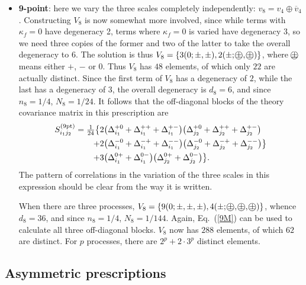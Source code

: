 \begin{itemize}
\item \textbf{9-point}: here we vary the three scales completely
  independently: $v_8 = v_4 \oplus \overline{v}_4$. Constructing
  $V_{8}$ is now somewhat more involved, since while terms with $\kappa_f=0$
  have degeneracy 2, terms where $\kappa_f=0$ is varied have
  degeneracy 3, so we need three copies of the former and two of the
  latter to take the overall degeneracy to 6.
%
  The solution is thus 
$V_8= \{3(0;\pm,\pm), 2(\pm;{\pm}\hspace{-.9em}{\bigcirc},{\pm}\hspace{-.9em}{\bigcirc})\}$, where  
${\pm}\hspace{-.9em}{\bigcirc}$ means either $+$, $-$ or $0$. Thus $V_8$ has $48$ elements, of 
  which only $22$ are actually distinct.
%
  Since the first term of $V_8$
has a degeneracy of $2$, while the last has a degeneracy of $3$, the
overall degeneracy is $d_8=6$, and since $n_8=1/4$, $N_8=1/24$.
%
It follows that the off-diagonal blocks of the theory covariance matrix
in this prescription are
\begin{equation}\label{9M}
\begin{split}
    S^{(\rm 9pt)}_{i_1j_2} =
    \hbox{${{1}\over {24}}$}\big\{&2\big(\Delta_{i_1}^{+0}+\Delta_{i_1}^{++}
    + \Delta_{i_1}^{+-}\big) \big(\Delta_{j_2}^{+0} +
    \Delta_{j_2}^{++} + \Delta_{j_2}^{+-} \big) \\ 
            + &2\big(\Delta_{i_1}^{-0} + \Delta_{i_1}^{-+} +
            \Delta_{i_1}^{--}\big)\big(\Delta_{j_2}^{-0} +
            \Delta_{j_2}^{-+} + \Delta_{j_2}^{--} \big) \big\}\\ 
            + &3\big(\Delta_{i_1}^{0+}+ \Delta_{i_1}^{0-}\big)\big(\Delta_{j_2}^{0+} + \Delta_{j_2}^{0-} \big)\big\}.
\end{split}            
\end{equation}
The pattern of correlations in the variation of the three scales in this expression should be clear from the way it is written.

When there are  three processes, $V_8= \{9(0;\pm,\pm,\pm),
4(\pm;\pmz,\pmz,\pmz)\}$, whence $d_8=36$, and since $n_8=1/4$,
$N_8=1/144$.
%
Again, Eq.~(\ref{9M}) can be used to calculate all three
off-diagonal blocks. $V_8$ now has $288$ elements, of which $62$ are
distinct. For $p$ processes, there are $2^p+2\cdot3^p$ distinct elements.  

\end{itemize}

\subsection{Asymmetric prescriptions}\label{sec_asym}
\label{sec:asympres}


